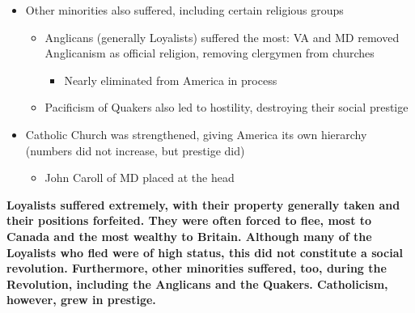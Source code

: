 \documentclass[a4paper]{article}
\begin{document}
{\begin{itemize}
\begin{itemize}
                    \item Most who were previously wealthy remained wealthy
                \end{itemize}
                \item Other minorities also suffered, including certain religious groups
                \begin{itemize}
                    \item Anglicans (generally Loyalists) suffered the most: VA and MD removed Anglicanism as official religion, removing clergymen from churches
                    \begin{itemize}
                        \item Nearly eliminated from America in process
                    \end{itemize}
                    \item Pacificism of Quakers also led to hostility, destroying their social prestige
                \end{itemize}
                \item Catholic Church was strengthened, giving America its own hierarchy (numbers did not increase, but prestige did)
                \begin{itemize}
                    \item John Caroll of MD placed at the head
                \end{itemize}
            \end{itemize}
            \textbf{Loyalists suffered extremely, with their property generally taken and their positions forfeited. They were often forced to flee, most to Canada and the most wealthy to Britain. Although many of the Loyalists who fled were of high status, this did not constitute a social revolution. Furthermore, other minorities suffered, too, during the Revolution, including the Anglicans and the Quakers. Catholicism, however, grew in prestige.}}
\end{document}
